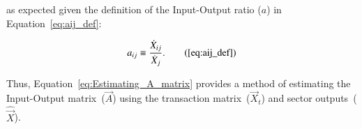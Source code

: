 \noindent{}as expected
given the definition of the Input-Output ratio ($a$) 
in Equation~\ref{eq:aij_def}:

\begin{equation}
	a_{ij} 
	\equiv \frac{\dot{X}_{ij}}{\dot{X}_{j}}.\tag{\ref{eq:aij_def}}
\end{equation}

Thus, Equation~\ref{eq:Estimating_A_matrix} provides a method 
of estimating the Input-Output matrix~($\vec{A}$) using
the transaction matrix~($\vec{X}_{t}$)
and sector outputs~($\hat{\vec{X}}$).



%
%
%
%
%
